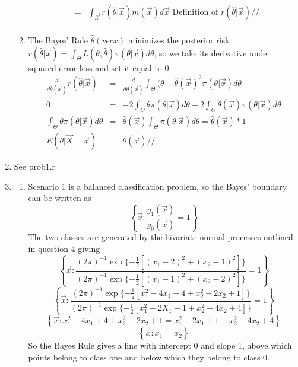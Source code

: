 \documentclass{article}
\begin{document}
\begin{enumerate}
\begin{enumerate}
\begin{eqnarray*}
                                               &=& \int_\vec{\mathcal{X}} r(\hat{\theta}|\vec{x})m(\vec{x})d\vec{x} \text{ Definition of }r(\hat{\theta}|\vec{x}) //\\
              \end{eqnarray*}
        \item The Bayes' Rule $\hat{\theta}(vec{x})$ minimizes the posterior risk $r(\hat{\theta}|\vec{x}) = \int_\Theta L(\theta,\hat{\theta})\pi(\theta|\vec{x})d\theta$, so we take its derivative under squared error loss and set it equal to 0
          \begin{eqnarray*}
            \frac{d}{d\hat{\theta}(\vec{x})}r(\hat{\theta}|\vec{x}) &=& \frac{d}{d\hat{\theta}(\vec{x})}\int_\Theta (\theta-\hat{\theta}(\vec{x})^2\pi(\theta|\vec{x})d\theta \\
                                                                  0 &=& -2\int_\Theta \theta\pi(\theta|\vec{x})d\theta + 2\int_\Theta \hat{\theta}(\vec{x})\pi(\theta|\vec{x})d\theta \\
                      \int_\Theta \theta\pi(\theta|\vec{x})d\theta  &=& \hat{\theta}(\vec{x})\int_\Theta \pi(\theta|\vec{x})d\theta = \hat{\theta}(\vec{x})*1 \\
                                        E(\theta|\vec{X}=\vec{x})   &=& \hat{\theta}(\vec{x}) //
          \end{eqnarray*}
      \end{enumerate}
    \item See prob1.r
    \item
      \begin{enumerate}
        \item Scenario 1 is a balanced classification problem, so the Bayes' boundary can be written as
          $$\left\{\vec{x}:\frac{g_1(\vec{x})}{g_0(\vec{x})}=1\right\}$$
          The two classes are generated by the bivariate normal processes outlined in question 4 giving
           $$ \left\{\vec{x}:\frac{(2\pi)^{-1}\exp\{-\frac{1}{2}[(x_1-2)^2+(x_2-1)^2]\}}{(2\pi)^{-1}\exp\{-\frac{1}{2}[(x_1-1)^2+(x_2-2)^2]\}} = 1 \right\}$$
           $$ \left\{\vec{x}:\frac{(2\pi)^{-1}\exp\{-\frac{1}{2}[x_1^2 - 4x_1 + 4 + x_2^2 -2x_2 + 1]\}}{(2\pi)^{-1}\exp\{-\frac{1}{2}[x_1^2 -2X_1 + 1 + x_2^2 -4x_2 + 4]\}} = 1 \right\}$$
           $$ \left\{\vec{x}:x_1^2 - 4x_1 + 4 + x_2^2 - 2x_2 + 1 = x_1^2 - 2x_1 + 1 + x_2^2 - 4x_2 + 4\right\}$$
           $$ \left\{\vec{x}: x_1 = x_2 \right\}$$
           So the Bayes Rule gives a line with intercept 0 and slope 1, above which points belong to class one and below which they belong to class 0. 

\end{enumerate}
\end{enumerate}
\end{document}
